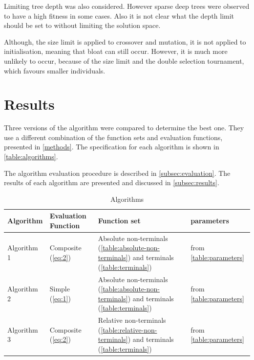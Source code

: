 \documentclass[12pt,a4paper]{article}
\begin{document}
	Limiting tree depth was also considered. However sparse deep trees were observed to have a high fitness in some cases. Also it is not clear what the depth limit should be set to without limiting the solution space. 
	
	Although, the size limit is applied to crossover  and mutation, it is not applied to initialisation, meaning that bloat can still occur. However, it is much more unlikely to occur, because of the size limit and the double selection tournament, which favours smaller individuals.

	\section{Results} \label{results}
	Three versions of the algorithm were compared to determine the best one. They use a different combination of the function sets and evaluation functions, presented in \autoref{methods}. The specification for each algorithm is shown in \autoref{table:algorithms}. 
	
	The algorithm evaluation procedure is described in \autoref{subsec:evaluation}. The results of each algorithm are presented and discussed in \autoref{subsec:results}.
	
		\begin{table}[h!]
			\centering
			\begin{tabu} to \textwidth {|X[1l]|X[2l]|X[2l]|X[1l]|}
				\hline
				\textbf{Algorithm} & \textbf{Evaluation Function} & \textbf{Function set} & \textbf{parameters} \\ \hline
				
				Algorithm 1  & Composite (\autoref{eq:2}) & Absolute non-terminals (\autoref{table:absolute-non-terminals}) and terminals (\autoref{table:terminals})  &  from \autoref{table:parameters}\\ \hline  
				
				Algorithm 2  & Simple (\autoref{eq:1}) & Absolute non-terminals (\autoref{table:absolute-non-terminals}) and terminals (\autoref{table:terminals})  &  from \autoref{table:parameters}\\ \hline  
				
				Algorithm 3  & Composite (\autoref{eq:2}) & Relative non-terminals (\autoref{table:relative-non-terminals}) and terminals (\autoref{table:terminals})  &  from \autoref{table:parameters}\\ \hline  
			\end{tabu}
			
			\caption{Algorithms}
			\label{table:algorithms}
		\end{table}
		
\end{document}
